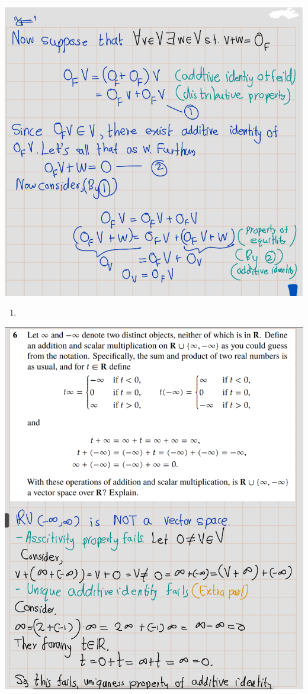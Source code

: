 \documentclass[
]{book}
\providecommand{\tightlist}{%
  \setlength{\itemsep}{0pt}\setlength{\parskip}{0pt}}
\theoremstyle{definition}
\theoremstyle{definition}
\theoremstyle{definition}
\theoremstyle{definition}
\theoremstyle{remark}
\begin{document}
\includegraphics[width=9.72in]{fig/Ex1B/Ex5-2}

\begin{enumerate}
\def\labelenumi{\arabic{enumi}.}
\setcounter{enumi}{5}
\tightlist
\item
\end{enumerate}

\includegraphics[width=9.94in]{fig/Ex1B/Ex6}
\end{document}
